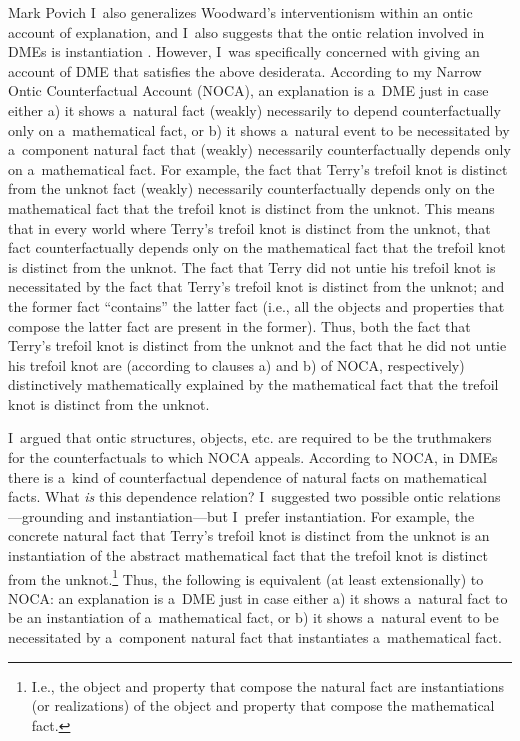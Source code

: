 \begin{artengenv}{Mark Povich}
I~also generalizes Woodward's interventionism within an ontic account of explanation, and I~also suggests that the ontic relation involved in DMEs is instantiation
\parencites*[][]{povich_minimal_2018}[][]{povich_narrow_2021}. %
 However, I~was specifically concerned with giving an account of DME that satisfies the above desiderata. According to my Narrow Ontic Counterfactual Account (NOCA), an explanation is a~DME just in case either a) it shows a~natural fact (weakly) necessarily to depend counterfactually only on a~mathematical fact, or b) it shows a~natural event to be necessitated by a~component natural fact that (weakly) necessarily counterfactually depends only on a~mathematical fact. For example, the fact that Terry's trefoil knot is distinct from the unknot fact (weakly) necessarily counterfactually depends only on the mathematical fact that the trefoil knot is distinct from the unknot. This means that in every world where Terry's trefoil knot is distinct from the unknot, that fact counterfactually depends only on the mathematical fact that the trefoil knot is distinct from the unknot. The fact that Terry did not untie his trefoil knot is necessitated by the fact that Terry's trefoil knot is distinct from the unknot; and the former fact ``contains'' the latter fact (i.e., all the objects and properties that compose the latter fact are present in the former). Thus, both the fact that Terry's trefoil knot is distinct from the unknot and the fact that he did not untie his trefoil knot are (according to clauses a) and b) of NOCA, respectively) distinctively mathematically explained by the mathematical fact that the trefoil knot is distinct from the unknot.

I~argued that ontic structures, objects, etc. are required to be the truthmakers for the counterfactuals to which NOCA appeals. According to NOCA, in DMEs there is a~kind of counterfactual dependence of natural facts on mathematical facts. What \textit{is} this dependence relation? I~suggested two possible ontic relations---grounding and instantiation---but I~prefer instantiation. For example, the concrete natural fact that Terry's trefoil knot is distinct from the unknot is an instantiation of the abstract mathematical fact that the trefoil knot is distinct from the unknot.\footnote{I.e., the object and property that compose the natural fact are instantiations (or realizations) of the object and property that compose the mathematical fact.} Thus, the following is equivalent (at least extensionally) to NOCA: an explanation is a~DME just in case either a) it shows a~natural fact to be an instantiation of a~mathematical fact, or b) it shows a~natural event to be necessitated by a~component natural fact that instantiates a~mathematical fact.


\end{artengenv}
